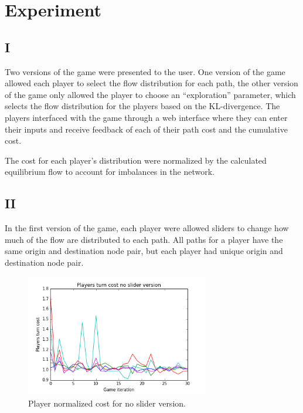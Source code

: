 \documentclass{sig-alternate-ipsn13}
\begin{document}
\section{Experiment}
\label{sec:experiment}

\subsection{I}

Two versions of the game were presented to the user. One version of the game allowed each player to select the flow distribution for each path, the other version of the game only allowed the player to choose an ``exploration'' parameter, which selects the flow distribution for the players based on the KL-divergence.
The players interfaced with the game through a web interface where they can enter their inputs and receive feedback of each of their path cost and the cumulative cost.


The cost for each player's distribution were normalized by the calculated equilibrium flow to account for imbalances in the network.


\subsection{II}
In the first version of the game, each player were allowed sliders to change how much of the flow are distributed to each path. All paths for a player have the same origin and destination node pair, but each player had unique origin and destination node pair.

\begin{figure}
  \centering
  \includegraphics[width=80mm]{images/no_slider_players_costs}
  \caption{Player normalized cost for no slider version.}
  \label{fig:cost_no_slider}
\end{figure}
\end{document}
